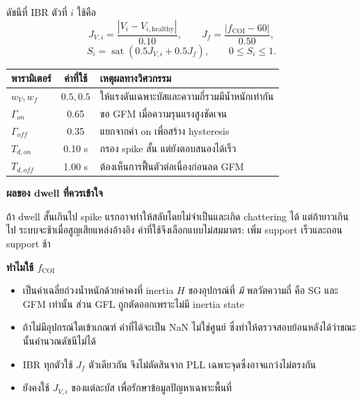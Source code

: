 \documentclass[12pt,a4paper]{article}
\begin{document}
\vspace{3pt}
\begin{minipage}[t]{0.52\textwidth}
ดัชนีที่ IBR ตัวที่ $i$ ใช้คือ
\[
J_{V,i}=\frac{|V_i-V_{i,\mathrm{healthy}}|}{0.10},\qquad
J_f=\frac{|f_{\mathrm{COI}}-60|}{0.50},
\]
\[
S_i=\operatorname{sat}\!\left(0.5J_{V,i}+0.5J_f\right),\qquad 0\le S_i\le1.
\]

\begin{center}
\small
\begin{tabularx}{\linewidth}{@{}>{\bfseries}l c X@{}}
\toprule
พารามิเตอร์ & ค่าที่ใช้ & เหตุผลทางวิศวกรรม \\
\midrule
$w_V,w_f$ & $0.5,0.5$ & ให้แรงดันเฉพาะบัสและความถี่รวมมีน้ำหนักเท่ากัน \\
$\Gamma_{on}$ & 0.65 & ขอ GFM เมื่อความรุนแรงสูงชัดเจน \\
$\Gamma_{off}$ & 0.35 & แยกจากค่า on เพื่อสร้าง hysteresis \\
$T_{d,on}$ & 0.10 s & กรอง spike สั้น แต่ยังตอบสนองได้เร็ว \\
$T_{d,off}$ & 1.00 s & ต้องเห็นการฟื้นตัวต่อเนื่องก่อนลด GFM \\
\bottomrule
\end{tabularx}
\end{center}
\end{minipage}\hfill
\begin{minipage}[t]{0.45\textwidth}
\textbf{ผลของ dwell ที่ควรเข้าใจ}
\begin{center}
\end{center}
\small
ถ้า dwell สั้นเกินไป spike แรกอาจทำให้สลับโดยไม่จำเป็นและเกิด chattering ได้ แต่ถ้ายาวเกินไป ระบบจะช้าเมื่อสูญเสียแหล่งอ้างอิง ค่าที่ใช้จึงเลือกแบบไม่สมมาตร: เพิ่ม support เร็วและถอน support ช้า

\textbf{ทำไมใช้ $f_{\mathrm{COI}}$}
\begin{itemize}
  \item เป็นค่าเฉลี่ยถ่วงน้ำหนักด้วยค่าคงที่ inertia $H$ ของอุปกรณ์ที่ \emph{มี} พลวัตความถี่ คือ SG และ GFM เท่านั้น ส่วน GFL ถูกตัดออกเพราะไม่มี inertia state
  \item ถ้าไม่มีอุปกรณ์ใดเข้าเกณฑ์ ค่าที่ได้จะเป็น NaN ไม่ใช่ศูนย์ ซึ่งทำให้ตรวจสอบย้อนหลังได้ว่าขณะนั้นคำนวณดัชนีไม่ได้
  \item IBR ทุกตัวใช้ $J_f$ ตัวเดียวกัน จึงไม่ตัดสินจาก PLL เฉพาะจุดซึ่งอาจแกว่งไม่ตรงกัน
  \item ยังคงใช้ $J_{V,i}$ ของแต่ละบัส เพื่อรักษาข้อมูลปัญหาเฉพาะพื้นที่
\end{itemize}
\end{minipage}
\end{document}
